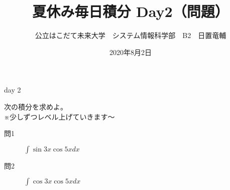 \documentclass[dvipdfmx,uplatex]{jsarticle}
\title{夏休み毎日積分 Day2（問題）}
\author{公立はこだて未来大学　システム情報科学部　B2　日置竜輔}
\date{2020年8月2日}
\begin{document}
\maketitle

\begin{itembox}[c]{day 2}
    \begin{center}
        次の積分を求めよ。\\
        ※少しずつレベル上げていきます〜
    \end{center}
\end{itembox}
\begin{description}
    \item [問1] $ \displaystyle \int \sin 3x \cos 5x dx $
\end{description}
\begin{description}
    \item [問2] $ \displaystyle \int \cos 3x \cos 5x dx $
\end{description}
\end{document}
